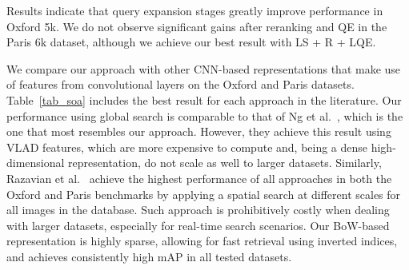 \documentclass{sig-arxiv}
\begin{document}
Results indicate that query expansion stages greatly improve performance in Oxford 5k. We do not observe significant gains after reranking and QE in the Paris 6k dataset, although we achieve our best result with LS + R + LQE.


We compare our approach with other CNN-based representations that make use of features from convolutional layers on the Oxford and Paris datasets. Table~\ref{tab_soa} includes the best result for each approach in the literature. Our performance using global search is comparable to that of Ng et al.~\cite{ng2015}, which is the one that most resembles our approach. However, they achieve this result using VLAD features, which are more expensive to compute and, being a dense high-dimensional representation, do not scale as well to larger datasets. Similarly, Razavian et al.~\cite{razavian2015} achieve the highest performance of all approaches in both the Oxford and Paris benchmarks by applying a spatial search at different scales for all images in the database. Such approach is prohibitively costly when dealing with larger datasets, especially for real-time search scenarios. Our BoW-based representation is highly sparse, allowing for fast retrieval using inverted indices, and achieves consistently high mAP in all tested datasets. 
\end{document}
